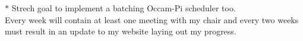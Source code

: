 $*$ Strech goal to implement a batching Occam-Pi scheduler too. \\

Every week will contain at least one meeting with my chair and every two weeks
must result in an update to my website laying out my progress.



\singlespacing





